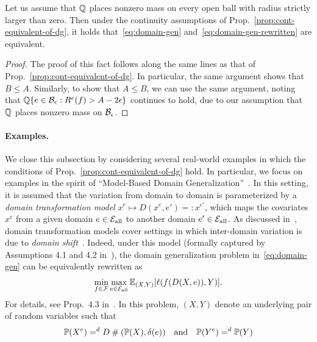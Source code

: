 \documentclass{article}
\begin{document}
\begin{corollary}
Let us assume that $\mathbb{Q}$ places nonzero mass on every open ball with radius strictly larger than zero.  Then under the continuity assumptions of Prop.~\ref{prop:cont-equivalent-of-dg}, it holds that~\eqref{eq:domain-gen} and~\eqref{eq:domain-gen-rewritten} are equivalent.
\end{corollary}

\begin{proof}
The proof of this fact follows along the same lines as that of Prop.~\ref{prop:cont-equivalent-of-dg}.  In particular, the same argument shows that $B\leq A$.  Similarly, to show that $A\leq B$, we can use the same argument, noting that $\mathbb{Q}\{e\in\mathcal{B}_\epsilon : R^e(f) > A-2\epsilon\}$ continues to hold, due to our assumption that $\mathbb{Q}$ places nonzero mass on $\mathcal{B}_\epsilon$.
\end{proof}

\paragraph{Examples.}  We close this subsection by considering several real-world examples in which the conditions of Prop.~\ref{prop:cont-equivalent-of-dg} hold.  In particular, we focus on examples in the spirit of ``Model-Based Domain Generalization''~\cite{robey2021modelbased}.  In this setting, it is assumed that the variation from domain to domain is parameterized by a \emph{domain transformation model} $x^e\mapsto D(x^e,e') =: x^{e'}$, which maps the covariates $x^e$ from a given domain $e\in{\mathcal{E}_\text{all}}$ to another domain $e'\in{\mathcal{E}_\text{all}}$.  As discussed in~\cite{robey2021modelbased}, domain transformation models cover settings in which inter-domain variation is due to \emph{domain shift}~\cite[\S 1.8]{quinonero2008dataset}.  Indeed, under this model (formally captured by Assumptions 4.1 and 4.2 in~\cite{robey2021modelbased}), the domain generalization problem in~\eqref{eq:domain-gen} can be equivalently rewritten as
%
\begin{align}
    \min_{f\in\mathcal{F}} \max_{e\in{\mathcal{E}_\text{all}}} \operatorname{\mathbb{E}}_{(X,Y)} [\ell(f(D(X,e)),Y)]. \label{eq:model-based-dg}
\end{align}
%
For details, see Prop.\ 4.3 in~\cite{robey2021modelbased}.  In this problem, $(X,Y)$ denote an underlying pair of random variables such that 
%
\begin{align}
    \mathbb{P}(X^e) =^d D \:\#\: (\mathbb{P}(X), \delta(e)) \quad\text{and}\quad \mathbb{P}(Y^e) =^d \mathbb{P}(Y) 
\end{align}
\end{document}
